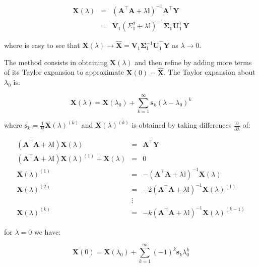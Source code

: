 \begin{eqnarray}
\label{eq:optsolRRsvd}
\mathbf{X}(\lambda) & = & (\mathbf{A}^\top \mathbf{A}+ \lambda
\mathbb{I})^{-1}\mathbf{A}^\top \mathbf{Y} \nonumber \\
& = &\mathbf{V}_1(\Sigma_1^2+\lambda \mathbb{I})^{-1}\mathbf{\Sigma_1
U_1^\top Y}
\end{eqnarray}

\noindent where is easy to see that $\mathbf{X}(\lambda) \rightarrow
\mathbf{\hat{X}}=\mathbf{V}_1 \mathbf{\Sigma}_1^{-1}\mathbf{U}_1^\top
\mathbf{Y}$ as $\lambda \rightarrow 0$. 

The method consists in obtaining $\mathbf{X}(\lambda)$ and then refine
by adding more terms of its Taylor expansion to approximate
$\mathbf{X}(0) = \mathbf{\hat{X}}$. The Taylor expansion about $\lambda_0$ is:

\begin{equation}
\label{eq:taylor}
    \mathbf{X}(\lambda)=\mathbf{X}(\lambda_0) + \sum_{k=1}^\infty
    \mathbf{s}_k(\lambda-\lambda_0)^{k}
\end{equation}


\noindent where $\mathbf{s}_k=\frac{1}{k!}\mathbf{X}(\lambda)^{(k)}$
and $\mathbf{X}(\lambda)^{(k)}$ is obtained by taking differences 
$\frac{\partial}{\partial \lambda}$ of:  

\begin{eqnarray*}
(\mathbf{A}^\top \mathbf{A}+ \lambda\mathbb{I}) \mathbf{X}(\lambda) & = & \mathbf{A}^\top \mathbf{Y}\\
(\mathbf{A}^\top \mathbf{A}+ \lambda\mathbb{I}) \mathbf{X}(\lambda)^{(1)} + \mathbf{X}(\lambda)& = & 0 \\
\mathbf{X}(\lambda)^{(1)}  &=& -(\mathbf{A}^\top \mathbf{A}+ \lambda\mathbb{I}) ^{-1} \mathbf{X}(\lambda) \\
\mathbf{X}(\lambda)^{(2)}  &=& -2(\mathbf{A}^\top \mathbf{A}+ \lambda\mathbb{I}) ^{-1} \mathbf{X}(\lambda)^{(1)} \\
& \vdots & \\
\mathbf{X}(\lambda)^{(k)}  &=& -k(\mathbf{A}^\top \mathbf{A}+ \lambda\mathbb{I}) ^{-1} \mathbf{X}(\lambda)^{(k-1)} 
\end{eqnarray*}



\noindent for $\lambda=0$ we have:

\begin{equation}
\label{eq:taylor}
    \mathbf{X}(0)=\mathbf{X}(\lambda_0) + \sum_{k=1}^\infty
     (-1)^k \mathbf{s}_k \lambda_0^k
\end{equation}


